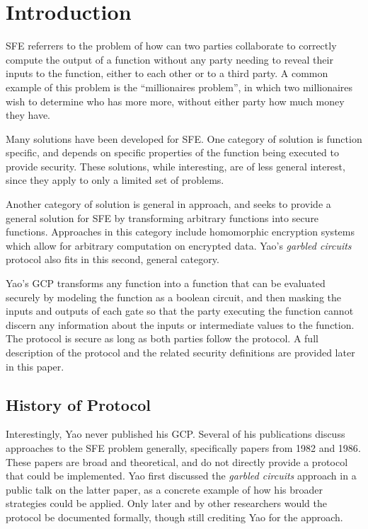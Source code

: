 \section{Introduction}
\label{sec:intro}

\ac{SFE} referrers to the problem of how can two parties collaborate to correctly compute the output of a function without any party needing to reveal their inputs to the function, either to each other or to a third party.  A common example of this problem is the ``millionaires problem'', in which two millionaires wish to determine who has more more, without either party how much money they have\cite{yao1982protocols}.

Many solutions have been developed for \ac{SFE}. One category of solution is function specific, and depends on specific properties of the function being executed to provide security\cite{huang2011faster}.  These solutions, while interesting, are of less general interest, since they apply to only a limited set of problems.

Another category of solution is general in approach, and seeks to provide a general solution for \ac{SFE} by transforming arbitrary functions into secure functions. Approaches in this category include homomorphic encryption systems\cite{gentry2009fully} which allow for arbitrary computation on encrypted data.  Yao's \emph{garbled circuits} protocol also fits in this second, general category.

Yao's \ac{GCP} transforms any function into a function that can be evaluated securely by modeling the function as a boolean circuit, and then masking the inputs and outputs of each gate so that the party executing the function cannot discern any information about the inputs or intermediate values to the function. The protocol is secure as long as both parties follow the protocol. A full description of the protocol and the related security definitions are provided later in this paper.

\subsection{History of Protocol}

Interestingly, Yao never published his \ac{GCP}. Several of his publications discuss approaches to the \ac{SFE} problem generally, specifically papers from 1982\cite{yao1982protocols} and 1986\cite{yao1986generate}. These papers are broad and theoretical, and do not directly provide a protocol that could be implemented. Yao first discussed the \emph{garbled circuits} approach in a public talk on the latter paper, as a concrete example of how his broader strategies could be applied\cite{bellare2012foundations}. Only later and by other researchers would the protocol be documented formally\cite{goldreich1987play}, though still crediting Yao for the approach.

